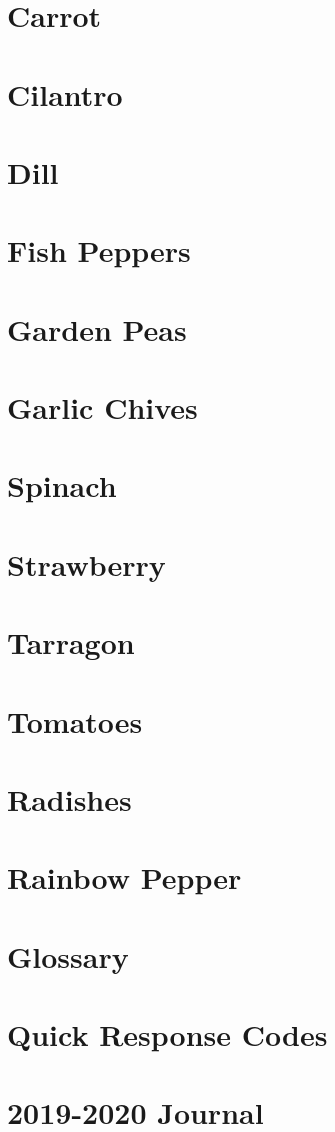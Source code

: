 \documentclass[12pt, oneside, a4paper]{memoir}
\begin{document}
\chapter{Carrot}
\chapter{Cilantro}
\chapter{Dill}
\chapter{Fish Peppers}
\chapter{Garden Peas}
\chapter{Garlic Chives}
\chapter{Spinach}
\chapter{Strawberry}
\chapter{Tarragon}
\chapter{Tomatoes}
\chapter{Radishes}
\chapter{Rainbow Pepper}

\backmatter
\chapter{Glossary}
\chapter{Quick Response Codes}
\chapter{2019-2020 Journal}
\end{document}
